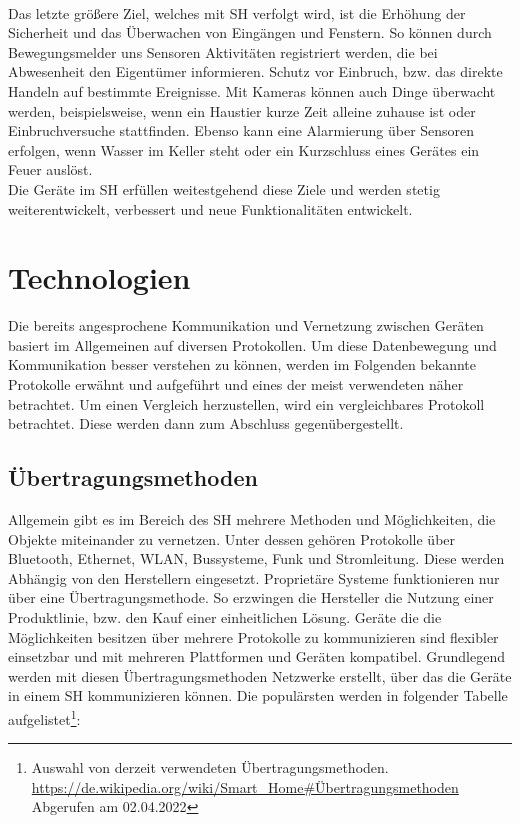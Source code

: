         \\
        \linebreak
        Das letzte größere Ziel, welches mit \acl{SH} verfolgt wird, ist die Erhöhung der Sicherheit und das Überwachen 
        von Eingängen und Fenstern. So können durch Bewegungsmelder uns Sensoren Aktivitäten registriert 
        werden, die bei Abwesenheit den Eigentümer informieren. Schutz vor Einbruch, bzw. das direkte Handeln auf 
        bestimmte Ereignisse. Mit Kameras können auch Dinge überwacht werden, beispielsweise, wenn ein Haustier 
        kurze Zeit alleine zuhause ist oder Einbruchversuche stattfinden. Ebenso kann eine Alarmierung über Sensoren erfolgen, 
        wenn Wasser im Keller steht oder ein Kurzschluss eines Gerätes ein Feuer auslöst. 
        \\
        \linebreak
        Die Geräte im \acl{SH} erfüllen weitestgehend diese Ziele und werden stetig weiterentwickelt, verbessert und neue 
        Funktionalitäten entwickelt.

\section{Technologien}
\label{sec:technologien}
    Die bereits angesprochene Kommunikation und Vernetzung zwischen Geräten basiert im Allgemeinen auf 
    diversen Protokollen. Um diese Datenbewegung und Kommunikation besser verstehen zu können, werden im 
    Folgenden bekannte Protokolle erwähnt und aufgeführt und eines der meist verwendeten näher betrachtet. 
    Um einen Vergleich herzustellen, wird ein vergleichbares Protokoll betrachtet. Diese werden dann zum 
    Abschluss gegenübergestellt. 

    \subsection{Übertragungsmethoden}
    \label{subsec:netzwerkprotokolle}
    Allgemein gibt es im Bereich des \acl{SH} mehrere Methoden und Möglichkeiten, die Objekte miteinander zu vernetzen. 
    Unter dessen gehören Protokolle über Bluetooth, Ethernet, WLAN, Bussysteme, Funk und Stromleitung. 
    Diese werden Abhängig von den Herstellern eingesetzt. Proprietäre Systeme funktionieren nur über eine 
    Übertragungsmethode. So erzwingen die Hersteller die Nutzung einer Produktlinie, bzw. den Kauf einer 
    einheitlichen Lösung. Geräte die die Möglichkeiten besitzen über mehrere Protokolle 
    zu kommunizieren sind flexibler einsetzbar und mit mehreren Plattformen und Geräten kompatibel.
    Grundlegend werden mit diesen Übertragungsmethoden Netzwerke erstellt, über das die Geräte in einem \acl{SH} kommunizieren können.
    Die populärsten werden in folgender Tabelle aufgelistet\footnote{Auswahl von derzeit verwendeten Übertragungsmethoden. \url{https://de.wikipedia.org/wiki/Smart_Home\#Übertragungsmethoden} Abgerufen am 02.04.2022}: 
    \\
    \linebreak